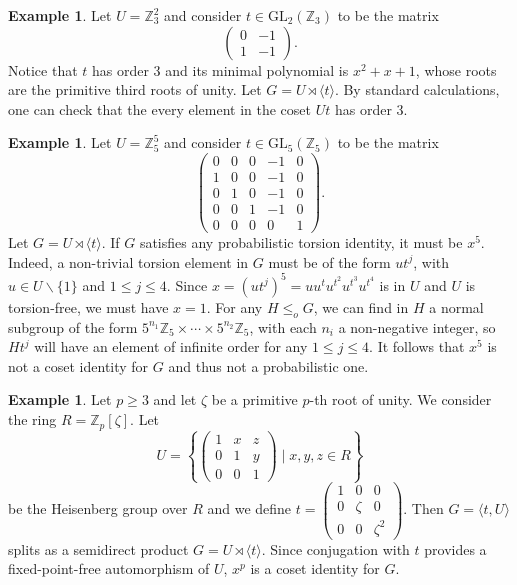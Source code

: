 \documentclass[a4paper,10pt]{amsart}
\theoremstyle{plain}
\theoremstyle{definition}
\newtheorem{example}[thm]{Example}
\newcommand{\bbZ}{\mathbb{Z}}
\numberwithin{equation}{section}
\begin{document}
\begin{example} %
        Let $U=\mathbb Z_3^2$ and consider $t \in \mathrm{GL}_2(\mathbb Z_3)$ to be the matrix
		\[\begin{pmatrix}
			0 & -1 \\ 1 & -1
		\end{pmatrix}.\]
        Notice that $t$ has order 3 and its minimal polynomial is $x^2+x+1$, whose roots are the primitive third roots of unity. Let $G = U \rtimes \langle t \rangle$. By standard calculations, one can check that the every element in the coset $Ut$ has order 3.
    \end{example}
    \begin{example}
        Let $U = \mathbb Z_5^5$ and consider $t \in \mathrm{GL}_5(\mathbb Z_5)$ to be the matrix
		\[\begin{pmatrix}
			0 & 0 & 0 & -1 & 0 \\ 
			1 & 0 & 0 & -1 & 0 \\
			0 & 1 & 0 & -1 & 0 \\
			0 & 0 & 1 & -1 & 0 \\
			0 & 0 & 0 & 0 & 1 
		\end{pmatrix}.\]
		Let $G= U \rtimes \langle t \rangle$. If $G$ satisfies any probabilistic torsion identity, it must be $x^5$. Indeed, a non-trivial torsion element in $G$ must be of the form $ut^{j}$, with $u \in U\smallsetminus \{1\}$ and $1\leq j \leq 4$. Since $x=(ut^j)^5 = uu^tu^{t^2}u^{t^{3}}u^{t^4}$ is in $U$ and $U$ is torsion-free, we must have $x=1$. For any $H \leq_o G$, we can find in $H$ a normal subgroup of the form $5^{n_1}\mathbb Z_5 \times \cdots \times 5^{n_2} \mathbb Z_5$, with each $n_i$ a non-negative integer, so $Ht^{j}$ will have an element of infinite order for any $1\leq j \leq 4$. It follows that $x^5$ is not a coset identity for $G$ and thus not a probabilistic one. 
        \end{example}
        \begin{example}
        Let $p \geq 3$ and let $\zeta$ be a primitive $p$-th root of unity. We consider the ring $R = \bbZ_p[\zeta]$.
        Let 
        \[U = \left\{\begin{pmatrix} 1& x & z \\ 0 & 1 & y \\ 0&0&1 \end{pmatrix} \mid x,y,z \in R \right\}\]
        be the Heisenberg group over $R$ and we define 
        $t = \begin{pmatrix} 1 & 0 & 0 \\ 0 & \zeta & 0 \\ 0 & 0 & \zeta^2 \end{pmatrix}$.
        Then $G = \langle t, U \rangle$ splits as a semidirect product $G = U \rtimes \langle t \rangle$. Since conjugation with $t$ provides a fixed-point-free automorphism of $U$, $x^p$ is a coset identity for $G$.
\end{example}
\end{document}
